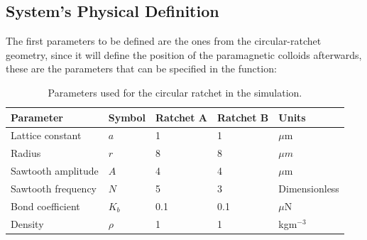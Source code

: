 \subsection{System's Physical Definition}

The first parameters to be defined are the ones from the circular-ratchet geometry, since it will define the position of the paramagnetic colloids afterwards, these are the parameters that can be specified in the function:

\begin{table}[H]
\centering
\caption[Ratchet physical parameters.]{Parameters used for the circular ratchet in the simulation.}
\begin{tabular}{l l l l l}
\hline
Parameter & Symbol & Ratchet A & Ratchet B & Units \\
\hline
Lattice constant & \(a\) & 1 & 1 & \(\mu \mathrm{m}\) \\
Radius & \( r\) & 8 & 8 & \( \mu m\) \\
Sawtooth amplitude & \( A\) & 4 & 4 & \( \mu \mathrm{m}\) \\
Sawtooth frequency & \( N\) & 5 & 3 & Dimensionless\\
Bond coefficient & \( K_b\) & 0.1 & 0.1 & \( \mu \mathrm{N}\) \\ 
Density & \(\rho\) & 1 & 1 & kgm\(^{-3}\) \\
\hline
\end{tabular}
\end{table}

